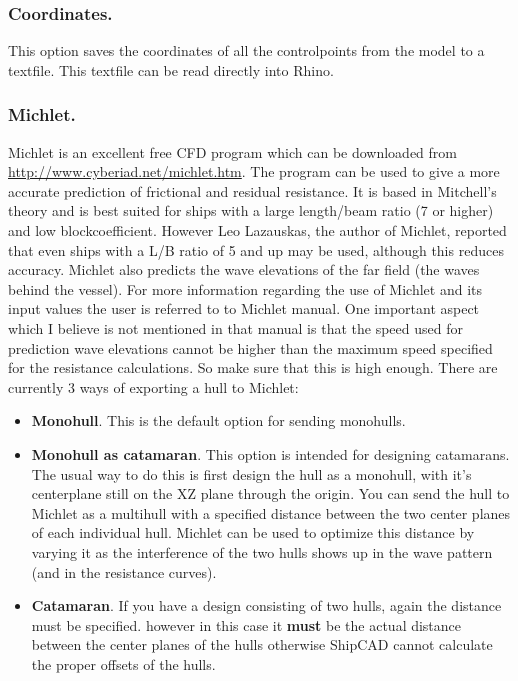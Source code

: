 \documentclass[12pt]{article}
\begin{document}
\subsubsection{Coordinates.}
This option saves the coordinates of all the controlpoints from the
model to a textfile. This textfile can be read directly into Rhino.

\subsubsection{Michlet.} \label{michlet}
Michlet is an excellent free CFD program which can be downloaded from
\url{http://www.cyberiad.net/michlet.htm}. The program can be used to give a more accurate prediction
of frictional and residual resistance. It is based in Mitchell's
theory and is best suited for ships with a large length/beam ratio (7
or higher) and low blockcoefficient. However Leo Lazauskas, the author
of Michlet, reported that even ships with a L/B ratio of 5 and up may
be used, although this reduces accuracy. Michlet also predicts the
wave elevations of the far field (the waves behind the vessel). For
more information regarding the use of Michlet and its input values the
user is referred to to Michlet manual.  One important aspect which I
believe is not mentioned in that manual is that the speed used for
prediction wave elevations cannot be higher than the maximum speed
specified for the resistance calculations. So make sure that this is
high enough.  There are currently 3 ways of exporting a hull to
Michlet:

\begin{itemize}

  \item \textbf{Monohull}. This is the default option for sending monohulls.

  \item \textbf{Monohull as catamaran}. This option is intended for designing catamarans. The usual
way to do this is first design the hull as a monohull, with it's centerplane still on the XZ
plane through the origin. You can send the hull to Michlet as a multihull with a specified
distance between the two center planes of each individual hull. Michlet can be used to
optimize this distance by varying it as the interference of the two hulls shows up in the
wave pattern (and in the resistance curves).

  \item \textbf{Catamaran}. If you have a design consisting of two hulls, again the distance must be
specified. however in this case it \textbf{must} be the actual distance between the center planes
of the hulls otherwise ShipCAD cannot calculate the proper offsets of
the hulls.

\end{itemize}
\end{document}
